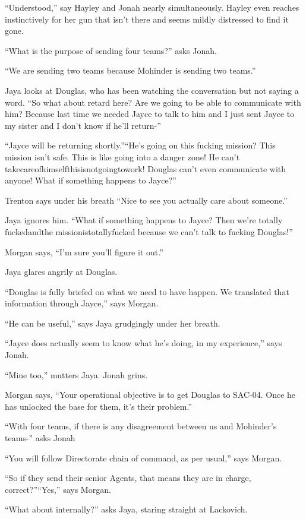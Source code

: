 ``Understood,'' say Hayley and Jonah nearly simultaneously.  Hayley even reaches instinctively for her gun that isn't there and seems mildly distressed to find it gone.

``What is the purpose of sending four teams?'' asks Jonah.

``We are sending two teams because Mohinder is sending two teams.''

Jaya looks at Douglas, who has been watching the conversation but not saying a word.  ``So what about retard here?  Are we going to be able to communicate with him?  Because last time we needed Jayce to talk to him and I just sent Jayce to my sister and I don't know if he'll return-''

``Jayce will be returning shortly.''``He's going on this fucking mission?  This mission isn't safe.  This is like going into a danger zone!  He can't takecareofhimselfthisisnotgoingtowork!  Douglas can't even communicate with anyone!  What if something happens to Jayce?''

Trenton says under his breath ``Nice to see you actually care about someone.''  

Jaya ignores him.  ``What if something happens to Jayce?  Then we're totally fuckedandthe missionistotallyfucked because we can't talk to fucking Douglas!''

Morgan says, ``I'm sure you'll figure it out.''

Jaya glares angrily at Douglas.

``Douglas is fully briefed on what we need to have happen.  We translated that information through Jayce,'' says Morgan.

``He can be useful,'' says Jaya grudgingly under her breath.

``Jayce does actually seem to know what he's doing, in my experience,'' says Jonah.

``Mine too,'' mutters Jaya.  Jonah grins.

Morgan says, ``Your operational objective is to get Douglas to SAC-04.  Once he has unlocked the base for them, it's their problem.''

``With four teams, if there is any disagreement between us and Mohinder's teams-'' asks Jonah

``You will follow Directorate chain of command, as per usual,'' says Morgan.

``So if they send their senior Agents, that means they are in charge, correct?''``Yes,'' says Morgan.

``What about internally?'' asks Jaya, staring straight at Lackovich.

